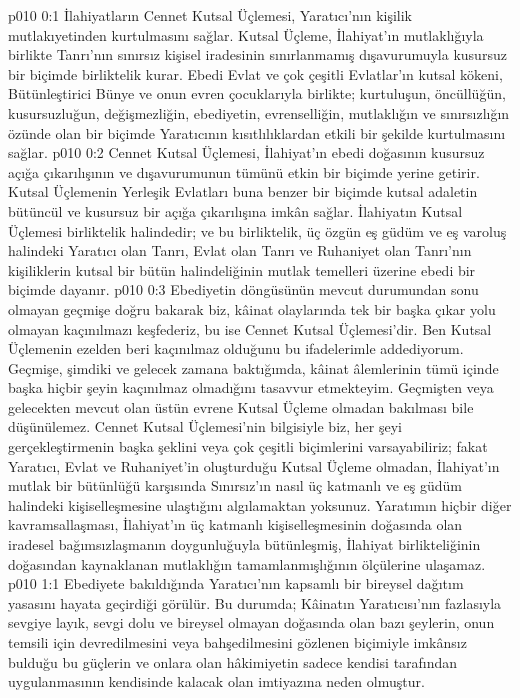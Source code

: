 \vs p010 0:1 İlahiyatların Cennet Kutsal Üçlemesi, Yaratıcı’nın kişilik mutlakıyetinden kurtulmasını sağlar. Kutsal Üçleme, İlahiyat’ın mutlaklığıyla birlikte Tanrı’nın sınırsız kişisel iradesinin sınırlanmamış dışavurumuyla kusursuz bir biçimde birliktelik kurar. Ebedi Evlat ve çok çeşitli Evlatlar’ın kutsal kökeni, Bütünleştirici Bünye ve onun evren çocuklarıyla birlikte; kurtuluşun, öncüllüğün, kusursuzluğun, değişmezliğin, ebediyetin, evrenselliğin, mutlaklığın ve sınırsızlığın özünde olan bir biçimde Yaratıcının kısıtlılıklardan etkili bir şekilde kurtulmasını sağlar.
\vs p010 0:2 Cennet Kutsal Üçlemesi, İlahiyat’ın ebedi doğasının kusursuz açığa çıkarılışının ve dışavurumunun tümünü etkin bir biçimde yerine getirir. Kutsal Üçlemenin Yerleşik Evlatları buna benzer bir biçimde kutsal adaletin bütüncül ve kusursuz bir açığa çıkarılışına imkân sağlar. İlahiyatın Kutsal Üçlemesi birliktelik halindedir; ve bu birliktelik, üç özgün eş güdüm ve eş varoluş halindeki Yaratıcı olan Tanrı, Evlat olan Tanrı ve Ruhaniyet olan Tanrı’nın kişiliklerin kutsal bir bütün halindeliğinin mutlak temelleri üzerine ebedi bir biçimde dayanır.
\vs p010 0:3 Ebediyetin döngüsünün mevcut durumundan sonu olmayan geçmişe doğru bakarak biz, kâinat olaylarında tek bir başka çıkar yolu olmayan kaçınılmazı keşfederiz, bu ise Cennet Kutsal Üçlemesi’dir. Ben Kutsal Üçlemenin ezelden beri kaçınılmaz olduğunu bu ifadelerimle addediyorum. Geçmişe, şimdiki ve gelecek zamana baktığımda, kâinat âlemlerinin tümü içinde başka hiçbir şeyin kaçınılmaz olmadığını tasavvur etmekteyim. Geçmişten veya gelecekten mevcut olan üstün evrene Kutsal Üçleme olmadan bakılması bile düşünülemez. Cennet Kutsal Üçlemesi’nin bilgisiyle biz, her şeyi gerçekleştirmenin başka şeklini veya çok çeşitli biçimlerini varsayabiliriz; fakat Yaratıcı, Evlat ve Ruhaniyet’in oluşturduğu Kutsal Üçleme olmadan, İlahiyat’ın mutlak bir bütünlüğü karşısında Sınırsız’ın nasıl üç katmanlı ve eş güdüm halindeki kişiselleşmesine ulaştığını algılamaktan yoksunuz. Yaratımın hiçbir diğer kavramsallaşması, İlahiyat’ın üç katmanlı kişiselleşmesinin doğasında olan iradesel bağımsızlaşmanın doygunluğuyla bütünleşmiş, İlahiyat birlikteliğinin doğasından kaynaklanan mutlaklığın tamamlanmışlığının ölçülerine ulaşamaz.
\vs p010 1:1 Ebediyete bakıldığında Yaratıcı’nın kapsamlı bir bireysel dağıtım yasasını hayata geçirdiği görülür. Bu durumda; Kâinatın Yaratıcısı’nın fazlasıyla sevgiye layık, sevgi dolu ve bireysel olmayan doğasında olan bazı şeylerin, onun temsili için devredilmesini veya bahşedilmesini gözlenen biçimiyle imkânsız bulduğu bu güçlerin ve onlara olan hâkimiyetin sadece kendisi tarafından uygulanmasının kendisinde kalacak olan imtiyazına neden olmuştur.
